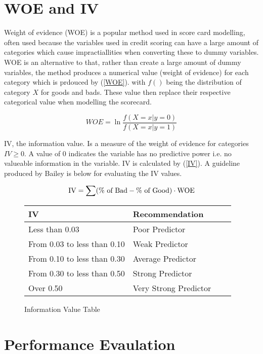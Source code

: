\section{WOE and IV}
Weight of evidence (WOE) is a popular method used in score card modelling, often used because the variables used in credit scoring can have a large amount of categories which cause impractiallities when converting these to dummy variables. WOE is an alternative to that, rather than create a large amount of dummy variables, the method produces a numerical value (weight of evidence) for each category which is prdouced by (\ref{WOE}). with $f()$ being the distribution of category $X$ for goods and bads. These value then replace their respective categorical value when modelling the scorecard.

\begin{equation}\label{WOE}
WOE = \ln \frac{f(X=x|y=0)}{f(X=x|y=1)}
\end{equation}

IV, the information value. Is a measure of the weight of evidence for categories $IV \geq 0$. A value of 0 indicates the variable has no predictive power i.e. no valueable information in the variable. IV is calculated by (\ref{IV}). A guideline produced by Bailey\cite{bailey2004credit} is below for evaluating the IV values.

\begin{equation}\label{IV}
\textup{IV} = \sum (\% \textup{ of Bad} - \% \textup{ of Good}) \cdot \textup{WOE}
\end{equation}

\begin{figure}[H]
	\centering
	\begin{tabular}{l l l l}
	IV	&Recommendation \\
	\hline
	Less than 0.03			&Poor Predictor \\
	From 0.03 to less than 0.10	&Weak Predictor \\
	From 0.10 to less than 0.30	&Average Predictor \\
	From 0.30 to less than 0.50	&Strong Predictor \\
	Over 0.50				&Very Strong Predictor \\
	\end{tabular}
	\caption{Information Value Table \label{Table1}}\cite{bailey2004credit}
\end{figure}

\section{Performance Evaulation}

